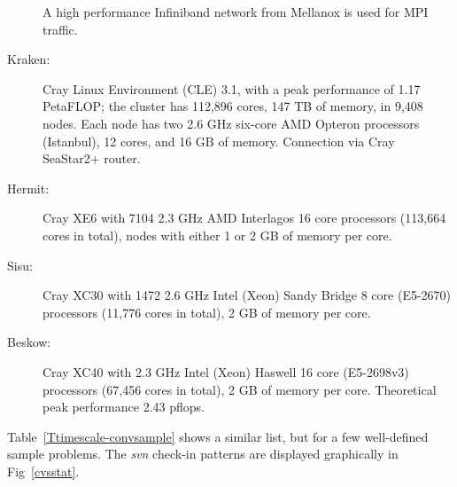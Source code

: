\documentclass[\mydriver,12pt,twoside,notitlepage,a4paper]{article}
\makeatletter
\newcommand{\name}[2][]{%
  \def\index@{#1}%
  \textsl{#2\/}%
  \ifx\index@\@empty\index{#2@\MakeUppercase #2}%
  \else\index{#1}%
  \fi%
}
\makeatother
\begin{document}
\begin{description}
A high performance Infiniband network from Mellanox is used for MPI traffic.
\item[Kraken:] Cray Linux Environment (CLE) 3.1, with a peak performance of 1.17 PetaFLOP;
the cluster has 112,896 cores, 147 TB of memory, in 9,408 nodes.
Each node has two 2.6 GHz six-core AMD Opteron processors (Istanbul), 12 cores, and 16 GB of memory.
Connection via Cray SeaStar2+ router.
\item[Hermit:] Cray XE6 with 7104 2.3 GHz AMD Interlagos 16 core processors (113,664 cores in total), nodes with either 1 or 2 GB of memory per core.
\item[Sisu:] Cray XC30 with 1472 2.6 GHz Intel (Xeon) Sandy Bridge 8 core (E5-2670) processors (11,776 cores in total), 2 GB of memory per core.
\item[Beskow:] Cray XC40 with 2.3 GHz Intel (Xeon) Haswell 16 core
(E5-2698v3) processors (67,456 cores in total), 2 GB of memory per core.
Theoretical peak performance 2.43 pflops.

\end{description}

Table~\ref{Ttimescale-convsample} shows a similar list, but for a few
well-defined sample problems.
The \name{svn}  check-in patterns are displayed graphically
in Fig~\ref{cvsstat}.
\end{document}
